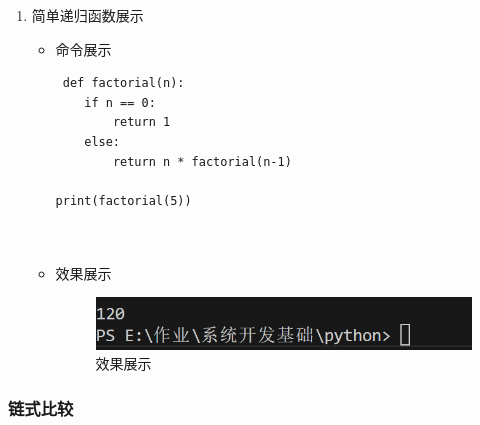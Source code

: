 \documentclass[UTF8]{ctexart}
\begin{document}
\begin{enumerate}
  \item 简单递归函数展示
  \begin{itemize}
  \item 命令展示
  \begin{verbatim}
 def factorial(n):
    if n == 0:
        return 1
    else:
        return n * factorial(n-1)

print(factorial(5))

    
  \end{verbatim}

  \item 效果展示
  \begin{figure}[H]
    \centering
    \includegraphics[width=\textwidth]{28} %
    \caption{效果展示}
  
  \end{figure}
\end{itemize}
\end{enumerate}






















\subsubsection{链式比较 }
\end{document}
